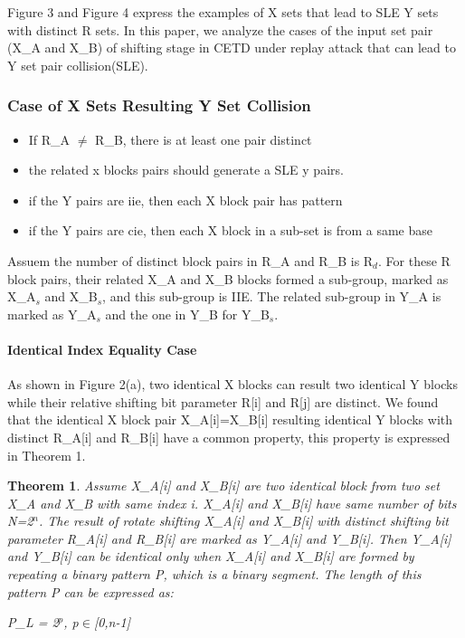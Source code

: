 \documentclass{article}
\newtheorem{theorem}{Theorem}[section]
\begin{document}
Figure 3 and Figure 4 express the examples of X sets that lead to SLE Y sets with distinct R sets. In this paper, we analyze the cases of the input set pair (X\_A and X\_B) of shifting stage in CETD under replay attack that can lead to Y set pair collision(SLE).



\subsubsection{Case of X Sets Resulting Y Set Collision}
\begin{itemize}
	\item If R\_A $\neq$ R\_B, there is at least one pair distinct
	\item the related x blocks pairs should generate a SLE y pairs.
	\item if the Y pairs are iie, then each X block pair has pattern
	\item if the Y pairs are cie, then each X block in a sub-set is from a same base
\end{itemize}
Assuem the number of distinct block pairs in R\_A and R\_B is R$_d$. For these R block pairs, their related X\_A and X\_B blocks formed a sub-group, marked as X\_A$_s$ and X\_B$_s$, and this sub-group is IIE. The related sub-group in Y\_A is marked as Y\_A$_s$ and the one in Y\_B for Y\_B$_s$.

\paragraph{Identical Index Equality Case}
As shown in Figure 2(a), two identical X blocks can result two identical Y blocks while their relative shifting bit parameter R[i] and R[j] are distinct. 
We found that the identical X block pair X\_A[i]=X\_B[i] resulting identical Y blocks with distinct R\_A[i] and R\_B[i] have a common property, this property is expressed in Theorem 1.

\begin{theorem}
Assume X\_A[i] and X\_B[i] are two identical block from two set X\_A and X\_B with same index i. X\_A[i] and X\_B[i] have same number of bits N=2$^n$. The result of rotate shifting X\_A[i] and X\_B[i] with distinct shifting bit parameter R\_A[i] and R\_B[i] are marked as Y\_A[i] and Y\_B[i]. Then Y\_A[i] and Y\_B[i] can be identical only when X\_A[i] and X\_B[i] are formed by repeating a binary pattern P, which is a binary segment. The length of this pattern P can be expressed as:

	P\_L = 2$^p$, p$\in$[0,n-1]
\end{theorem}
\end{document}
